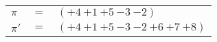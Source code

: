 \begin{example}\label{example:AWNIOTEZ}
  \hfill
  \begin{\position}
    \begin{tabular}{lll}
      $\pi$  & $=$ & $({+4}~{+1}~{+5}~{-3}~{-2})$ \\
      $\pi'$ & $=$ & $({+4}~{+1}~{+5}~{-3}~{-2}~{+6}~{+7}~{+8})$ \\
    \end{tabular}
  \end{\position}
\end{example}